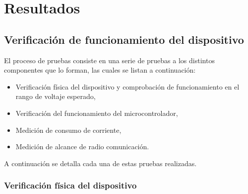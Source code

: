 \chapter{Resultados}



\section{Verificaci\'on de funcionamiento del dispositivo}

El proceso de pruebas consiste en una serie de pruebas a los distintos componentes que lo forman, las cuales se listan a continuaci\'on:

\begin{itemize}
\item Verificaci\'on f\'isica del dispositivo y comprobaci\'on de funcionamiento en el rango de voltaje esperado, 
\item Verificaci\'on del funcionamiento del microcontrolador, 
\item Medici\'on de consumo de corriente, 
\item Medici\'on de alcance de radio comunicaci\'on.
\end{itemize}

A continuaci\'on se detalla cada una de estas pruebas realizadas. 

\subsection{Verificaci\'on f\'isica del dispositivo}

